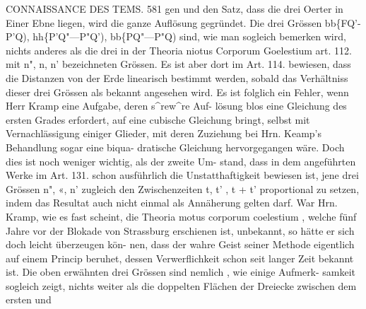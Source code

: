 \documentclass[12pt,a4paper]{article}
\begin{document}
\newpage
CONNAISSANCE DES TEMS. 581\newline
gen und den Satz, dass die drei Oerter in Einer Ebne liegen, wird die ganze Auflösung gegründet.\newline
Die drei Grössen\newline
bb\{FQ'-P'Q), hh\{P'Q"---P"Q'), bb\{PQ"---P"Q)\newline
sind, wie man sogleich bemerken wird, nichts anderes als die drei in der Theoria niotus Corporum\newline
Goelestium art. 112. mit n", n, n' bezeichneten Grössen. Es ist aber dort im Art. 114. bewiesen, dass\newline
die Distanzen von der Erde linearisch bestimmt werden, sobald das Verhältniss dieser drei Grössen als\newline
bekannt angesehen wird. Es ist folglich ein Fehler, wenn Herr Kramp eine Aufgabe, deren s\^{}rew\^{}re Auf-\newline
lösung blos eine Gleichung des ersten Grades erfordert, auf eine cubische Gleichung bringt, selbst mit\newline
Vernachlässigung einiger Glieder, mit deren Zuziehung bei Hrn. Keamp's Behandlung sogar eine biqua-\newline
dratische Gleichung hervorgegangen wäre. Doch dies ist noch weniger wichtig, als der zweite Um-\newline
stand, dass in dem angeführten Werke im Art. 131. schon ausführlich die Unstatthaftigkeit bewiesen ist,\newline
jene drei Grössen n", «, n' zugleich den Zwischenzeiten t, t' , t + t' proportional zu setzen, indem das\newline
Resultat auch nicht einmal als Annäherung gelten darf.\newline
War Hrn. Kramp, wie es fast scheint, die Theoria motus corporum coelestium , welche fünf Jahre\newline
vor der Blokade von Strassburg erschienen ist, unbekannt, so hätte er sich doch leicht überzeugen kön-\newline
nen, dass der wahre Geist seiner Methode eigentlich auf einem Princip beruhet, dessen Verwerflichkeit\newline
schon seit langer Zeit bekannt ist. Die oben erwähnten drei Grössen sind nemlich , wie einige Aufmerk-\newline
samkeit sogleich zeigt, nichts weiter als die doppelten Flächen der Dreiecke zwischen dem ersten und\newline
\end{document}
